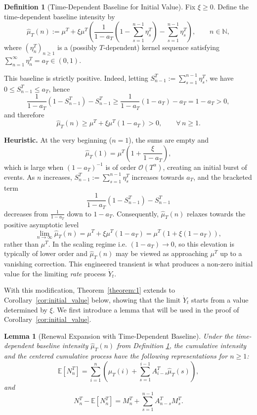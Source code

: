 \documentclass[letterpaper]{article}
\numberwithin{equation}{section}
\newtheorem{lemma}[theorem]{Lemma}
\theoremstyle{definition}
\newtheorem{definition}[theorem]{Definition}
\theoremstyle{remark}
\begin{document}
{
\begin{definition}[Time-Dependent Baseline for Initial Value]\label{def:time_dependent_mu}
Fix $\xi \ge 0$. Define the time-dependent baseline intensity by
\[
  \hat{\mu}_T(n)
  := \mu^T + \xi \mu^T \left(
    \frac{1}{1-a_T}\left( 1 - \sum_{s=1}^{n-1}\eta_s^T \right)
    - \sum_{s=1}^{n-1}\eta_s^T
  \right), \qquad n\in\mathbb N,
\]
where $(\eta_n^T)_{n\ge 1}$ is a (possibly $T$-dependent) kernel sequence satisfying
$\sum_{n=1}^\infty \eta_n^T = a_T \in (0,1)$.

This baseline is strictly positive. Indeed, letting $S_{n-1}^T:=\sum_{s=1}^{n-1}\eta_s^T$, we have
$0\le S_{n-1}^T\le a_T$, hence
\[
  \frac{1}{1-a_T}(1-S_{n-1}^T)-S_{n-1}^T
  \ge \frac{1}{1-a_T}(1-a_T)-a_T
  = 1-a_T>0,
\]
and therefore
\[
  \hat{\mu}_T(n)\ge \mu^T+\xi\mu^T(1-a_T)>0,\qquad \forall\,n\ge1.
\]
\end{definition}

\noindent\textbf{Heuristic.}
At the very beginning ($n=1$), the sums are empty and
\[
  \hat{\mu}_T(1) = \mu^T\left(1+\frac{\xi}{1-a_T}\right),
\]
which is large when $(1-a_T)^{-1}$ is of order $\mathcal O(T^\alpha)$, creating an initial burst of events.
As $n$ increases, $S_{n-1}^T:=\sum_{s=1}^{n-1}\eta_s^T$ increases towards $a_T$, and the bracketed term
\[
  \frac{1}{1-a_T}(1-S_{n-1}^T)-S_{n-1}^T
\]
decreases from $\frac{1}{1-a_T}$ down to $1-a_T$.
Consequently, $\hat{\mu}_T(n)$ relaxes towards the positive asymptotic level
\[
  \lim_{n\to\infty}\hat{\mu}_T(n)
  = \mu^T+\xi\mu^T(1-a_T)
  = \mu^T\left(1+\xi(1-a_T)\right),
\]
rather than $\mu^T$.
In the scaling regime i.e. $(1-a_T)\to 0$, so this elevation is typically of lower order and
$\hat{\mu}_T(n)$ may be viewed as approaching $\mu^T$ up to a vanishing correction.
This engineered transient is what produces a non-zero initial value for the limiting \emph{rate} process $\dot Y_t$.

\medskip
With this modification, Theorem~\ref{theorem:1} extends to Corollary~\ref{cor:initial_value} below, showing that the
limit $\dot Y_t$ starts from a value determined by $\xi$.
We first introduce a lemma that will be used in the proof of Corollary~\ref{cor:initial_value}.}

\begin{lemma}[Renewal Expansion with Time-Dependent Baseline]\label{lemma:renewal_expansion_with_initial_value}
  Under the time-dependent baseline intensity $\hat{\mu}_T(n)$ from Definition \ref{def:time_dependent_mu}, the cumulative intensity and the centered cumulative process have the following representations for $n \ge 1$:
  \begin{equation}\label{eq:expectation_cumulative_lambda_initial_value}
    \mathbb{E}[N_n^T] = \sum_{i=1}^n \left( \hat{\mu}_T(i) + \sum_{s=1}^{i-1} A_{i-s}^T \hat{\mu}_T(s) \right),
  \end{equation}
  and
  \begin{equation}\label{eq:centered_N_initial_value}
    N_n^T - \mathbb{E}[N_n^T] = M_n^T + \sum_{s=1}^{n-1} A_{n-s}^T M_s^T.
  \end{equation}
\end{lemma}
\end{document}
